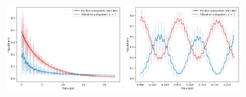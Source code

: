 \documentclass[11pt]{article}
\begin{document}
\begin{figure}[H]
    \begin{subfigure}{\textwidth}
        \centering
        \includegraphics[width=0.49\textwidth]{Research Project/Code/results/ExVib/Open/Population/Envelope/pops_ex_therm_eg.png}
        \hfill
        \includegraphics[width=0.49\textwidth]{Research Project/Code/results/ExVib/Open/Population/Fast/pops_ex_therm_eg.png}
        \caption{}
        \label{fig:EVM_OQS_Pop_therm_eg}
    \end{subfigure}

    \vspace{0.8em}


\end{figure}
\end{document}
